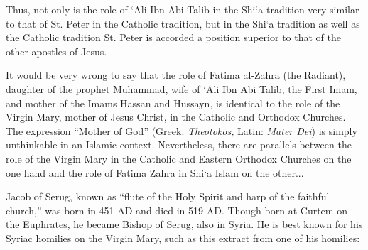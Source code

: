 Thus, not only is the role of `Ali Ibn Abi Talib in the Shi`a tradition very similar to that of St. Peter in the Catholic tradition, but in the Shi`a tradition as well as the Catholic tradition St. Peter is accorded a position superior to that of the other apostles of Jesus.

It would be very wrong to say that the role of Fatima al-Zahra (the Radiant), daughter of the prophet Muhammad, wife of `Ali Ibn Abi Talib, the First Imam, and mother of the Imams Hassan and Hussayn, is identical to the role of the Virgin Mary, mother of Jesus Christ, in the Catholic and Orthodox Churches. The expression ``Mother of God'' (Greek: \emph{Theotokos,} Latin: \emph{Mater Dei}) is simply unthinkable in an Islamic context. Nevertheless, there are parallels between the role of the Virgin Mary in the Catholic and Eastern Orthodox Churches on the one hand and the role of Fatima Zahra in Shi`a Islam on the other...

Jacob of Serug, known as ``flute of the Holy Spirit and harp of the faithful church,'' was born in 451 AD and died in 519 AD. Though born at Curtem on the Euphrates, he became Bishop of Serug, also in Syria. He is best known for his Syriac homilies on the Virgin Mary, such as this extract from one of his homilies:

